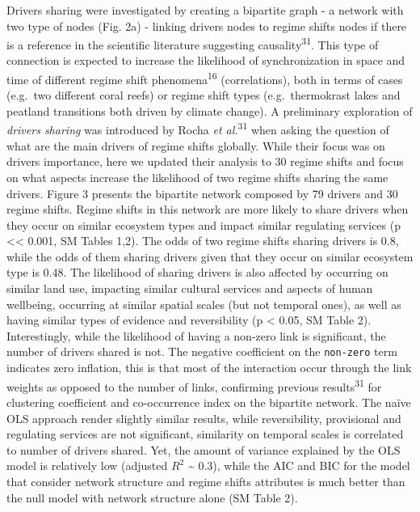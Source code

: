\documentclass[9pt,]{article}
\begin{document}
Drivers sharing were investigated by creating a bipartite graph - a
network with two type of nodes (Fig. 2a) - linking drivers nodes to
regime shifts nodes if there is a reference in the scientific literature
suggesting causality\textsuperscript{31}. This type of connection is
expected to increase the likelihood of synchronization in space and time
of different regime shift phenomena\textsuperscript{16} (correlations),
both in terms of cases (e.g.~two different coral reefs) or regime shift
types (e.g.~thermokrast lakes and peatland transitions both driven by
climate change). A preliminary exploration of \emph{drivers sharing} was
introduced by Rocha \emph{et al.}\textsuperscript{31} when asking the
question of what are the main drivers of regime shifts globally. While
their focus was on drivers importance, here we updated their analysis to
30 regime shifts and focus on what aspects increase the likelihood of
two regime shifts sharing the same drivers. Figure 3 presents the
bipartite network composed by 79 drivers and 30 regime shifts. Regime
shifts in this network are more likely to share drivers when they occur
on similar ecosystem types and impact similar regulating services (p
\textless{}\textless{} 0.001, SM Tables 1,2). The odds of two regime
shifts sharing drivers is 0.8, while the odds of them sharing drivers
given that they occur on similar ecosystem type is 0.48. The likelihood
of sharing drivers is also affected by occurring on similar land use,
impacting similar cultural services and aspects of human wellbeing,
occurring at similar spatial scales (but not temporal ones), as well as
having similar types of evidence and reversibility (p \textless{} 0.05,
SM Table 2). Interestingly, while the likelihood of having a non-zero
link is significant, the number of drivers shared is not. The negative
coefficient on the \texttt{non-zero} term indicates zero inflation, this
is that most of the interaction occur through the link weights as
opposed to the number of links, confirming previous
results\textsuperscript{31} for clustering coefficient and co-occurrence
index on the bipartite network. The naïve OLS approach render slightly
similar results, while reversibility, provisional and regulating
services are not significant, similarity on temporal scales is
correlated to number of drivers shared. Yet, the amount of variance
explained by the OLS model is relatively low (adjusted \(R^2\)
\textasciitilde{} 0.3), while the AIC and BIC for the model that
consider network structure and regime shifts attributes is much better
than the null model with network structure alone (SM Table 2).
\end{document}
